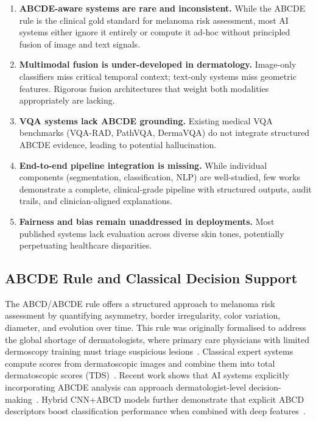 \documentclass[conference]{IEEEtran}
\begin{document}
\begin{enumerate}[leftmargin=*]
    \item \textbf{ABCDE-aware systems are rare and inconsistent.} While
          the ABCDE rule is the clinical gold standard for melanoma risk
          assessment, most AI systems either ignore it entirely or compute
          it ad-hoc without principled fusion of image and text signals.
    \item \textbf{Multimodal fusion is under-developed in dermatology.}
          Image-only classifiers miss critical temporal context; text-only
          systems miss geometric features. Rigorous fusion architectures that
          weight both modalities appropriately are lacking.
    \item \textbf{VQA systems lack ABCDE grounding.} Existing medical VQA
          benchmarks (VQA-RAD, PathVQA, DermaVQA) do not integrate
          structured ABCDE evidence, leading to potential hallucination.
    \item \textbf{End-to-end pipeline integration is missing.} While individual
          components (segmentation, classification, NLP) are well-studied,
          few works demonstrate a complete, clinical-grade pipeline with
          structured outputs, audit trails, and clinician-aligned explanations.
    \item \textbf{Fairness and bias remain unaddressed in deployments.}
          Most published systems lack evaluation across diverse skin tones,
          potentially perpetuating healthcare disparities.
\end{enumerate}

\subsection{ABCDE Rule and Classical Decision Support}

The ABCD/ABCDE rule offers a structured approach to melanoma risk
assessment by quantifying asymmetry, border irregularity, color
variation, diameter, and evolution over time. This rule was originally
formalised to address the global shortage of dermatologists, where
primary care physicians with limited dermoscopy training must triage
suspicious lesions~\cite{dreremoula2022_derm_shortage}. Classical expert
systems compute scores from dermatoscopic images and combine them into
total dermatoscopic scores (TDS)~\cite{chatterjee2021_abcd_expert_system,
senan2021_abcd_analysis,tas2022_fast_abcd_tds}. Recent work shows that
AI systems explicitly incorporating ABCDE analysis can approach
dermatologist-level decision-making~\cite{jutte2024_generative_ABCDE,
mevorach2025_ai_vs_derm_abcde}. Hybrid CNN+ABCD models further
demonstrate that explicit ABCD descriptors boost classification
performance when combined with deep features~\cite{shetty2022_hybridcnn_abcd}.
\end{document}
